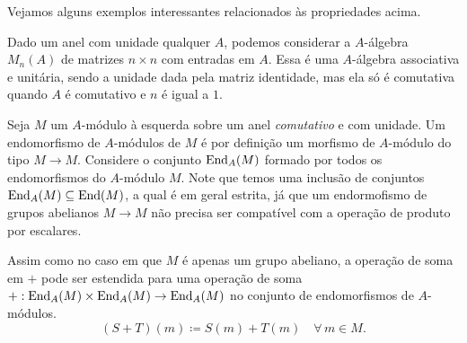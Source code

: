 Vejamos alguns exemplos interessantes relacionados às propriedades acima.

\begin{exem}\label{exem:algebra_matrizes}
  Dado um anel com unidade qualquer $A$, podemos considerar a $A$-álgebra $M_n(A)$ de matrizes $n \times n$ com entradas em $A$.
  Essa é uma $A$-álgebra associativa e unitária, sendo a unidade dada pela matriz identidade, mas ela só é comutativa quando $A$ é comutativo e $n$ é igual a $1$.
\end{exem}

\begin{exem}\label{exem:algebra_endomorfismos}
  Seja $M$ um $A$-módulo à esquerda sobre um anel \emph{comutativo} e com unidade.
  Um endomorfismo de $A$-módulos de $M$ é por definição um morfismo de $A$-módulo do tipo $M \to M$.
  Considere o conjunto $\mathrm{End}_A(M)$ formado por todos os endomorfismos do $A$-módulo $M$.
  Note que temos uma inclusão de conjuntos $\mathrm{End}_{A}(M) \subseteq \mathrm{End}(M)$, a qual é em geral estrita, já que um endormofismo de grupos abelianos $M \to M$ não precisa ser compatível com a operação de produto por escalares.

  Assim como no caso em que $M$ é apenas um grupo abeliano, a operação de soma em $+$ pode ser estendida para uma operação de soma $+: \mathrm{End}_A(M) \times \mathrm{End}_A(M) \to \mathrm{End}_A(M)$ no conjunto de endomorfismos de $A$-módulos.
  \begin{displaymath}
    (S+T)(m) \coloneqq S(m) + T(m) \quad \forall\, m \in M.
  \end{displaymath}


\end{exem}
